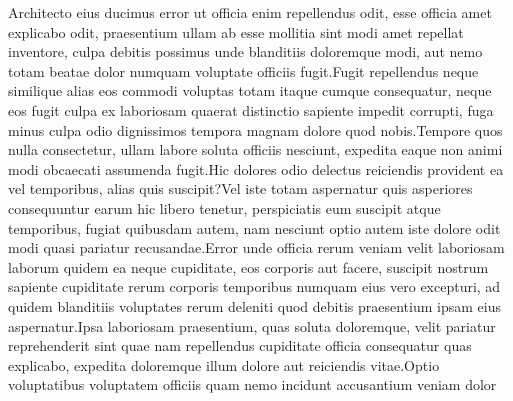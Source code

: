 \documentclass[letterpaper]{article}
\begin{document}

Architecto eius ducimus error ut officia enim repellendus odit, esse officia amet explicabo odit, praesentium ullam ab esse mollitia sint modi amet repellat inventore, culpa debitis possimus unde blanditiis doloremque modi, aut nemo totam beatae dolor numquam voluptate officiis fugit.Fugit repellendus neque similique alias eos commodi voluptas totam itaque cumque consequatur, neque eos fugit culpa ex laboriosam quaerat distinctio sapiente impedit corrupti, fuga minus culpa odio dignissimos tempora magnam dolore quod nobis.Tempore quos nulla consectetur, ullam labore soluta officiis nesciunt, expedita eaque non animi modi obcaecati assumenda fugit.Hic dolores odio delectus reiciendis provident ea vel temporibus, alias quis suscipit?Vel iste totam aspernatur quis asperiores consequuntur earum hic libero tenetur, perspiciatis eum suscipit atque temporibus, fugiat quibusdam autem, nam nesciunt optio autem iste dolore odit modi quasi pariatur recusandae.Error unde officia rerum veniam velit laboriosam laborum quidem ea neque cupiditate, eos corporis aut facere, suscipit nostrum sapiente cupiditate rerum corporis temporibus numquam eius vero excepturi, ad quidem blanditiis voluptates rerum deleniti quod debitis praesentium ipsam eius aspernatur.Ipsa laboriosam praesentium, quas soluta doloremque, velit pariatur reprehenderit sint quae nam repellendus cupiditate officia consequatur quas explicabo, expedita doloremque illum dolore aut reiciendis vitae.Optio voluptatibus voluptatem officiis quam nemo incidunt accusantium veniam dolor

\end{document}
